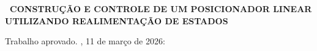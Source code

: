 \begin{folhadeaprovacao}

  \begin{center}
    {\ABNTEXchapterfont\large\imprimirautor}

    \vspace*{\fill}\vspace*{\fill}
    {\ABNTEXchapterfont\bfseries\large\ CONSTRUÇÃO E CONTROLE DE UM POSICIONADOR LINEAR UTILIZANDO REALIMENTAÇÃO DE ESTADOS}
    \vspace*{\fill}
    
    \hspace{.45\textwidth}
    \begin{minipage}{.5\textwidth}
        \imprimirpreambulo
    \end{minipage}%
    \vspace*{\fill}
   \end{center}
    
   Trabalho aprovado. \imprimirlocal, 11 de março de 2026: %

      
   \begin{center}
    \vspace*{0.5cm}
    {\large\imprimirlocal}
    \par
    {\large\imprimirdata}
    \vspace*{1cm}
  \end{center}
  
\end{folhadeaprovacao}